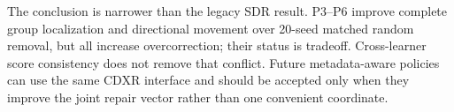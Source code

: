 \documentclass[sigconf,review]{acmart}
\begin{document}
The conclusion is narrower than the legacy SDR result. P3--P6 improve complete
group localization and directional movement over 20-seed matched random
removal, but all increase overcorrection; their status is tradeoff.
Cross-learner score consistency does not remove that conflict. Future
metadata-aware policies can use the same CDXR interface and should be accepted
only when they improve the joint repair vector rather than one convenient
coordinate.



\end{document}
